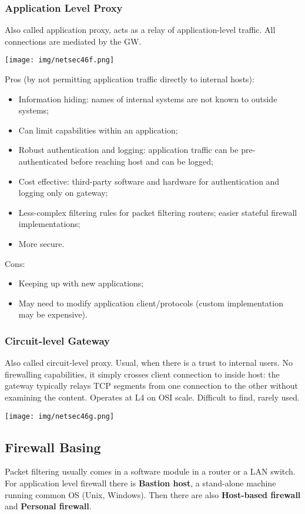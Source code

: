 \documentclass[a4paper, 10pt, titlepage]{article}
\begin{document}
\subsubsection*{Application Level Proxy}
Also called application proxy, acts as a relay of application-level traffic. All connections are mediated by the GW.
\begin{center}
	\texttt{[image: img/netsec46f.png]}
\end{center}
Pros (by not permitting application traffic directly to internal hosts):
\begin{itemize}
	\item Information hiding: names of internal systems are not known to outside systems;
	\item Can limit capabilities within an application;
	\item Robust authentication and logging: application traffic can be pre-authenticated before reaching host and can be logged;
	\item Cost effective: third-party software and hardware for authentication and logging only on gateway;
	\item Less-complex filtering rules for packet filtering routers; easier stateful firewall implementations;
	\item More secure.
\end{itemize}
Cons:
\begin{itemize}
	\item Keeping up with new applications;
	\item May need to modify application client/protocols (custom implementation may be expensive).
\end{itemize}

\subsubsection*{Circuit-level Gateway}
Also called circuit-level proxy. Usual, when there is a trust to internal users. No firewalling capabilities, it simply crosses client connection to inside host: the gateway typically relays TCP segments from one connection to the other without examining the content. Operates at L4 on OSI scale. Difficult to find, rarely used.
\begin{center}
	\texttt{[image: img/netsec46g.png]}
\end{center}

\subsection*{Firewall Basing}
Packet filtering usually comes in a software module in a router or a LAN switch. For application level firewall there is \textbf{Bastion host}, a stand-alone machine running common OS (Unix, Windows). Then there are also \textbf{Host-based firewall} and \textbf{Personal firewall}. 
\end{document}
